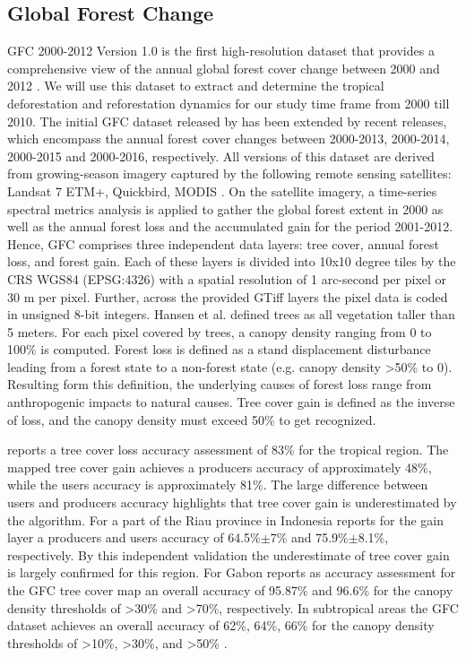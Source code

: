 	\subsection{Global Forest Change}
		\ac{GFC} 2000-2012 Version 1.0 is the first high-resolution dataset that provides a comprehensive view of the annual global forest cover change between 2000 and 2012 \citep{Hansen2013,Li2017}. We will use this dataset to extract and determine the tropical deforestation and reforestation dynamics for our study time frame from 2000 till 2010. The initial \ac{GFC} dataset released by \citeauthor{Hansen2013} has been extended by recent releases, which encompass the annual forest cover changes between 2000-2013, 2000-2014, 2000-2015 and 2000-2016, respectively. All versions of this dataset are derived from growing-season imagery captured by the following remote sensing satellites: Landsat 7 ETM+, Quickbird, MODIS \citep{Hansen2013}. On the satellite imagery, a time-series spectral metrics analysis is applied to gather the global forest extent in 2000 as well as the annual forest loss and the accumulated gain for the period 2001-2012. Hence, \ac{GFC} comprises three independent data layers: tree cover, annual forest loss, and forest gain. Each of these layers is divided into 10x10 degree tiles by the \ac{CRS} \ac{WGS84} (EPSG:4326) with a spatial resolution of 1 arc-second per pixel or 30 m per pixel. Further, across the provided \ac{GTiff} layers the pixel data is coded in unsigned 8-bit integers. Hansen et al. defined trees as all vegetation taller than 5 meters. For each pixel covered by trees, a canopy density ranging from 0 to 100\% is computed. Forest loss is defined as a stand displacement disturbance leading from a forest state to a non-forest state (e.g. canopy density >50\% to 0). Resulting form this definition, the underlying causes of forest loss range from anthropogenic impacts to natural causes. Tree cover gain is defined as the inverse of loss, and the canopy density must exceed 50\% to get recognized.

		\citet{Hansen2013} reports a tree cover loss accuracy assessment of 83\% for the tropical region. The mapped tree cover gain achieves a producers accuracy of approximately 48\%, while the users accuracy is approximately 81\%. The large difference between users and producers accuracy highlights that tree cover gain is underestimated by the algorithm. For a part of the Riau province in Indonesia \citet{Arjasakusuma2018} reports for the gain layer a producers and users accuracy of 64.5\%$\pm$7\% and 75.9\%$\pm$8.1\%, respectively. By this independent validation the underestimate of tree cover gain is largely confirmed for this region. For Gabon \citet{Sannier2016} reports as accuracy assessment for the \ac{GFC} tree cover map an overall accuracy of 95.87\% and 96.6\% for the canopy density thresholds of >30\% and >70\%, respectively. In subtropical areas the \ac{GFC} dataset achieves an overall accuracy of 62\%, 64\%, 66\% for the canopy density thresholds of >10\%, >30\%, and >50\% \citep{McRoberts2016}.

